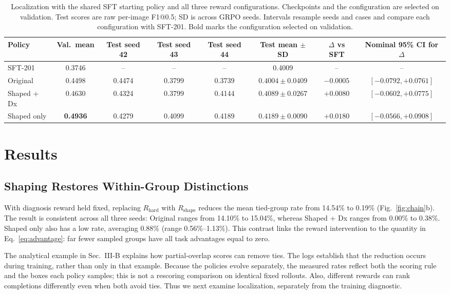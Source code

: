 \documentclass[conference]{IEEEtran}
\begin{document}
\begin{table}[t]
\centering
\caption{Localization with the shared SFT starting policy and all three reward configurations. Checkpoints and the configuration are selected on validation. Test scores are raw per-image F1@0.5; SD is across GRPO seeds. Intervals resample seeds and cases and compare each configuration with SFT-201. Bold marks the configuration selected on validation.}
\label{tab:main}
\small
\setlength{\tabcolsep}{5pt}
\begin{tabular}{@{}lccccccc@{}}
\toprule
Policy & Val.\ mean & Test seed 42 & Test seed 43 & Test seed 44 & Test mean $\pm$ SD & $\Delta$ vs SFT & Nominal 95\% CI for $\Delta$\\
\midrule
SFT-201 & 0.3746 & -- & -- & -- & 0.4009 & -- & --\\
Original & 0.4498 & 0.4474 & 0.3799 & 0.3739 & $0.4004\pm0.0409$ & $-0.0005$ & $[-0.0792,+0.0761]$\\
Shaped + Dx & 0.4630 & 0.4324 & 0.3799 & 0.4144 & $0.4089\pm0.0267$ & $+0.0080$ & $[-0.0602,+0.0775]$\\
Shaped only & \textbf{0.4936} & 0.4279 & 0.4099 & 0.4189 & $\mathbf{0.4189}\pm0.0090$ & $+0.0180$ & $[-0.0566,+0.0908]$\\
\bottomrule
\end{tabular}
\end{table}

\section{Results}
\subsection{Shaping Restores Within-Group Distinctions}
With diagnosis reward held fixed, replacing $R_{\mathrm{hard}}$ with $R_{\mathrm{shape}}$ reduces the mean tied-group rate from 14.54\% to 0.19\% (Fig.~\ref{fig:chain}b). The result is consistent across all three seeds: Original ranges from 14.10\% to 15.04\%, whereas Shaped + Dx ranges from 0.00\% to 0.38\%. Shaped only also has a low rate, averaging 0.88\% (range 0.56\%--1.13\%). This contrast links the reward intervention to the quantity in Eq.~\eqref{eq:advantage}: far fewer sampled groups have all task advantages equal to zero.

The analytical example in Sec.~III-B explains how partial-overlap scores can remove ties. The logs establish that the reduction occurs during training, rather than only in that example. Because the policies evolve separately, the measured rates reflect both the scoring rule and the boxes each policy samples; this is not a rescoring comparison on identical fixed rollouts. Also, different rewards can rank completions differently even when both avoid ties. Thus we next examine localization, separately from the training diagnostic.
\end{document}

